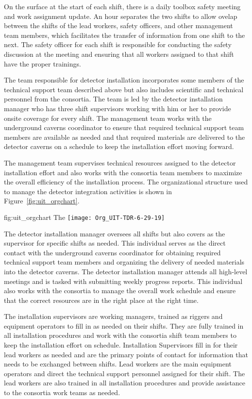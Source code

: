 On the surface at the start of each shift, there is a daily 
toolbox safety meeting and work assignment update. An hour 
separates the two shifts to allow ovelap between the shifts 
of the lead workers, safety officers, and other management 
team members, which facilitates the transfer of information 
from one shift to the next. The safety officer for each shift 
is responsible for conducting the safety discussion at the 
meeting and ensuring that all workers assigned to that shift 
have the proper trainings.

The team responsible for detector installation incorporates 
some members of the technical support team described above 
but also includes scientific and technical personnel from 
the  consortia.  The team is led by the detector 
installation manager who has three shift supervisors working 
with him or her to provide onsite coverage for every shift.
The management team works with the underground caverns 
coordinator to ensure that required technical support team 
members are available as needed and that required materials 
are delivered to the detector caverns on a schedule to keep
the installation effort moving forward.         

The management team supervises technical resources assigned to 
the detector installation effort and also works with the consortia 
team members to maximize the overall efficiency of the installation 
process.  The organizational structure used to manage the detector 
integration activities is shown in Figure~\ref{fig:uit_orgchart}.
\begin{dunefigure}{fig:uit_orgchart}
  {The }
  \texttt{[image: Org\_UIT-TDR-6-29-19]}
\end{dunefigure}

The detector installation manager oversees all shifts but also 
covers as the supervisor for specific shifts as needed.  This 
individual serves as the direct contact with the underground caverns 
coordinator for obtaining required technical support
team members and organizing the delivery of needed materials 
into the detector caverns.  The detector installation manager 
attends all high-level meetings and is tasked with submitting
weekly progress reports.  This individual also works with the 
 consortia to manage the overall work schedule 
and ensure that the correct resources are in the right place
at the right time. 
    
The installation supervisors are working managers, trained as 
riggers and equipment operators to fill in as needed on their 
shifts.  They are fully trained in all installation procedures
and work with the consortia shift team members to keep the 
installation effort on schedule.  Installation Supervisors 
fill in for their lead workers as needed and are the primary 
points of contact for information that needs to be exchanged 
between shifts.  Lead workers are the main equipment operators 
and direct the technical support personnel assigned for their 
shift.  The lead workers are also trained in all installation 
procedures and provide assistance to the consortia work teams 
as needed.  

